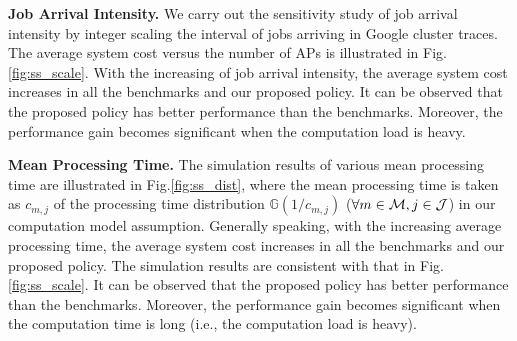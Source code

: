 \textbf{Job Arrival Intensity.}
We carry out the sensitivity study of job arrival intensity by integer scaling the interval of jobs arriving in Google cluster traces.
The average system cost versus the number of APs is illustrated in Fig.\ref{fig:ss_scale}.
With the increasing of job arrival intensity, the average system cost increases in all the benchmarks and our proposed policy.
It can be observed that the proposed policy has better performance than the benchmarks.
Moreover, the performance gain becomes significant when the computation load is heavy.

\textbf{Mean Processing Time.}
The simulation results of various mean processing time are illustrated in Fig.\ref{fig:ss_dist}, where the mean processing time is taken as $c_{m,j}$ of the processing time distribution $\mathbb{G}(1/c_{m,j})$ ($\forall m\in\mathcal{M},j\in\mathcal{J}$) in our computation model assumption.
Generally speaking, with the increasing average processing time, the average system cost increases in all the benchmarks and our proposed policy.
The simulation results are consistent with that in Fig.\ref{fig:ss_scale}.
It can be observed that the proposed policy has better performance than the benchmarks.
Moreover, the performance gain becomes significant when the computation time is long (i.e., the computation load is heavy).


